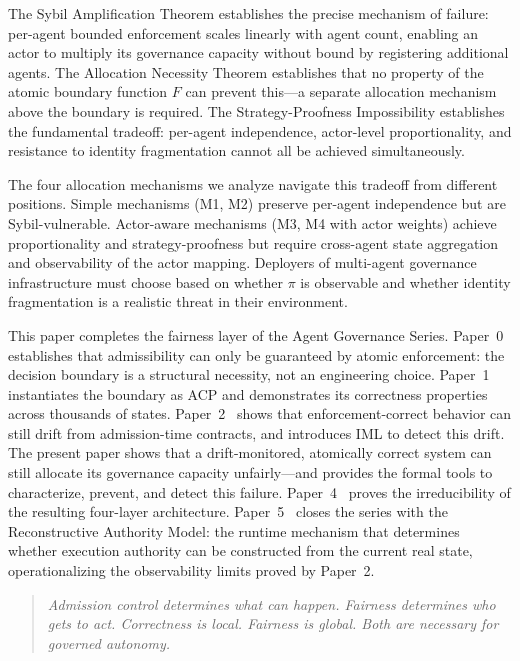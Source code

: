 \documentclass[11pt]{article}
\theoremstyle{plain}
\theoremstyle{definition}
\theoremstyle{remark}
\newcommand{\owner}{\pi}                   %
\begin{document}
The Sybil Amplification Theorem establishes the precise mechanism of
failure: per-agent bounded enforcement scales linearly with agent count,
enabling an actor to multiply its governance capacity without bound by
registering additional agents.  The Allocation Necessity Theorem
establishes that no property of the atomic boundary function $F$ can
prevent this---a separate allocation mechanism above the boundary is
required.  The Strategy-Proofness Impossibility establishes the
fundamental tradeoff: per-agent independence, actor-level
proportionality, and resistance to identity fragmentation cannot all be
achieved simultaneously.

The four allocation mechanisms we analyze navigate this tradeoff from
different positions.  Simple mechanisms (M1, M2) preserve per-agent
independence but are Sybil-vulnerable.  Actor-aware mechanisms (M3,
M4 with actor weights) achieve proportionality and strategy-proofness
but require cross-agent state aggregation and observability of the
actor mapping.  Deployers of multi-agent governance infrastructure
must choose based on whether $\owner$ is observable and whether
identity fragmentation is a realistic threat in their environment.

This paper completes the fairness layer of the Agent Governance Series.
Paper~0~\citep{fernandez2026a} establishes that admissibility can only
be guaranteed by atomic enforcement: the decision boundary is a
structural necessity, not an engineering choice.
Paper~1~\citep{fernandez2026b} instantiates the boundary as ACP and
demonstrates its correctness properties across thousands of states.
Paper~2~\citep{fernandez2026c} shows that enforcement-correct behavior
can still drift from admission-time contracts, and introduces IML to
detect this drift.  The present paper shows that a drift-monitored,
atomically correct system can still allocate its governance capacity
unfairly---and provides the formal tools to characterize, prevent, and
detect this failure.  Paper~4~\citep{fernandez2026comp} proves the
irreducibility of the resulting four-layer architecture.
Paper~5~\citep{fernandez2026ram} closes the series with the
Reconstructive Authority Model: the runtime mechanism that determines
whether execution authority can be constructed from the current real
state, operationalizing the observability limits proved by Paper~2.

\begin{quote}
\textit{Admission control determines what can happen.
Fairness determines who gets to act.
Correctness is local. Fairness is global.
Both are necessary for governed autonomy.}
\end{quote}



\end{document}
